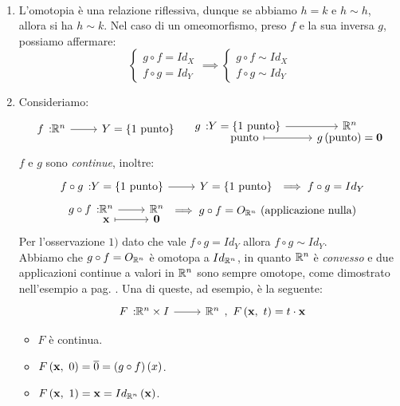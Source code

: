 \begin{demonstration}~{}
	\begin{enumerate}[label=\Roman*]
		\item L'omotopia è una relazione riflessiva, dunque se abbiamo $h=k$ e $h\sim h$, allora si ha $h\sim k$. Nel caso di un omeomorfismo, preso $f$ e la sua inversa $g$, possiamo affermare:
		\begin{equation*}
			\begin{cases}
				g\circ f=Id_X\\
				f\circ g=Id_Y
			\end{cases}\implies
		\begin{cases}
			g\circ f\sim Id_X\\
			f\circ g\sim Id_Y
		\end{cases}
		\end{equation*}
	\item Consideriamo:
	\begin{equation}
		\funz{f}{\realset^n}{Y=\left\{1\text{ punto}\right\}}\quad\funztot{g}{Y=\left\{1\text{ punto}\right\}}{\realset^n}{\text{punto}}{g\left(\text{punto}\right)=\mathbf{0}}
	\end{equation}
$f$ e $g$ sono \textit{continue}, inoltre:
	\begin{gather*}
		\funz{f\circ g}{Y=\left\{1\text{ punto}\right\}}{Y=\left\{1\text{ punto}\right\}}\implies f\circ g= Id_Y\\
		\funztot{g\circ f}{\realset^n}{\realset^n}{\mathbf{x}}{\mathbf{0}}\implies g\circ f=O_{\realset^n}\ \text{(applicazione nulla)}
	\end{gather*}
Per l'osservazione $1)$ dato che vale $f\circ g= Id_Y$ allora $f\circ g\sim Id_Y$.\\
Abbiamo che $g\circ f=O_{\mathbb{R}^n}$ è omotopa a $Id_{\mathbb{R}^n}$, in quanto $\mathbb{R}^n$ è \textit{convesso} e due applicazioni continue a valori in $\mathbb{R}^n$ sono sempre omotope, come dimostrato nell'esempio a pag. \pageref{convessoomotope}. Una di queste, ad esempio, è la seguente:
\begin{equation*}
\funz{F}{\realset^n\times I}{\realset^n},\ \mvf{F}{\mathbf{x}}{t}=t\cdot \mathbf{x}
\end{equation*}
\begin{itemize}
	\item $F$ è continua.
	\item $F\left(\mathbf{x},\ 0\right)=\overline{0}=\left(g\circ f\right)\left(x\right)$.
	\item $F\left(\mathbf{x},\ 1\right)=\mathbf{x}=Id_{\mathbb{R}^n}\left(\mathbf{x}\right)$.
\end{itemize}
\end{enumerate}
\vspace{-3mm}
\end{demonstration}
